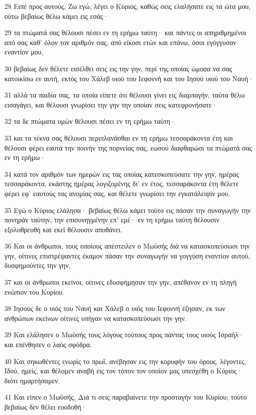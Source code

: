 \par 28 Ειπέ προς αυτούς, Ζω εγώ, λέγει ο Κύριος, καθώς σεις ελαλήσατε εις τα ώτα μου, ούτω βεβαίως θέλω κάμει εις εσάς·
\par 29 τα πτώματά σας θέλουσι πέσει εν τη ερήμω ταύτη· και πάντες οι απηριθμημένοι από σας καθ' όλον τον αριθμόν σας, από είκοσι ετών και επάνω, όσοι εγόγγυσαν εναντίον μου,
\par 30 βεβαίως δεν θέλετε εισέλθει σεις εις την γην, περί της οποίας ώμοσα να σας κατοικίσω εν αυτή, εκτός του Χάλεβ υιού του Ιεφοννή και του Ιησού υιού του Ναυή·
\par 31 αλλά τα παιδία σας, τα οποία είπετε ότι θέλουσι γίνει εις διαρπαγήν, ταύτα θέλω εισαγάγει, και θέλουσι γνωρίσει την γην την οποίαν σεις κατεφρονήσατε·
\par 32 τα δε πτώματα υμών θέλουσι πέσει εν τη ερήμω ταύτη·
\par 33 και τα τέκνα σας θέλουσι περιπλανάσθαι εν τη ερήμω τεσσαράκοντα έτη και θέλουσι φέρει εαυτά την ποινήν της πορνείας σας, εωσού διαφθαρώσι τα πτώματά σας εν τη ερήμω·
\par 34 κατά τον αριθμόν των ημερών εις τας οποίας κατεσκοπεύσατε την γην, ημέρας τεσσαράκοντα, εκάστης ημέρας λογιζομένης δι' εν έτος, τεσσαράκοντα έτη θέλετε φέρει εφ' εαυτούς τας ανομίας σας, και θέλετε γνωρίσει την εγκατάλειψίν μου.
\par 35 Εγώ ο Κύριος ελάλησα· βεβαίως θέλω κάμει τούτο εις πάσαν την συναγωγήν την πονηράν ταύτην, την επισυνηγμένην επ' εμέ· εν τη ερήμω ταύτη θέλουσιν εξολοθρευθή και εκεί θέλουσιν αποθάνει.
\par 36 Και οι άνθρωποι, τους οποίους απέστειλεν ο Μωϋσής διά να κατασκοπεύσωσι την γην, οίτινες επιστρέψαντες έκαμον πάσαν την συναγωγήν να γογγύση εναντίον αυτού, δυσφημούντες την γην,
\par 37 και οι άνθρωποι εκείνοι, οίτινες εδυσφήμησαν την γην, απέθανον εν τη πληγή ενώπιον του Κυρίου.
\par 38 Ιησούς δε ο υιός του Ναυή και Χάλεβ ο υιός του Ιεφοννή έζησαν, εκ των ανθρώπων εκείνων οίτινες υπήγαν να κατασκοπεύσωσι την γην.
\par 39 Και ελάλησεν ο Μωϋσής τους λόγους τούτους προς πάντας τους υιούς Ισραήλ· και επένθησεν ο λαός σφόδρα.
\par 40 Και σηκωθέντες ενωρίς το πρωΐ, ανέβησαν εις την κορυφήν του όρους, λέγοντες, Ιδού, ημείς, και θέλομεν αναβή εις τον τόπον τον οποίον μας υπεσχέθη ο Κύριος· διότι ημαρτήσαμεν.
\par 41 Και είπεν ο Μωϋσής, Διά τι σεις παραβαίνετε την προσταγήν του Κυρίου; τούτο βεβαίως δεν θέλει ευοδοθή·
